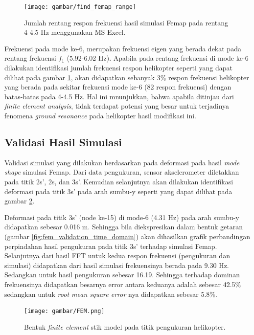 \begin{figure}[h]
	\centering
	\texttt{[image: gambar/find\_femap\_range]}
	\caption{Jumlah rentang respon frekuensi hasil simulasi Femap pada rentang 4-4.5 Hz menggunakan MS Excel.}
	\label{fig:fem_range}
\end{figure}


Frekuensi pada mode ke-6, merupakan frekuensi eigen yang berada dekat pada rentang frekuensi $f_1$ (5.92-6.02 Hz). Apabila pada rentang frekuensi di mode ke-6 dilakukan identifikasi jumlah frekuensi respon helikopter seperti yang dapat dilihat pada gambar \ref{fig:fem_range}, akan didapatkan sebanyak $3\%$ respon frekuensi helikopter yang berada pada sekitar frekuensi mode ke-6 (82 respon frekuensi) dengan batas-batas pada 4-4.5 Hz. Hal ini mnunjukkan, bahwa apabila ditinjau dari \textit{finite element analysis}, tidak terdapat potensi yang besar untuk terjadinya fenomena \textit{ground resonance} pada helikopter hasil modifikasi ini. 

\subsection{Validasi Hasil Simulasi}

Validasi simulasi yang dilakukan berdasarkan pada deformasi pada hasil \textit{mode shape} simulasi Femap. Dari data pengukuran, sensor akselerometer diletakkan pada titik 2s', 2s, dan 3s'. Kemudian selanjutnya akan dilakukan identifikasi deformasi pada titik 3s' pada arah sumbu-y seperti yang dapat dilihat pada gambar \ref{fig:FEM_pengukuran}.

Deformasi pada titik 3s' (node ke-15) di mode-6 (4.31 Hz) pada arah sumbu-y didapatkan sebesar 0.016 m. Sehingga bila diekspresikan dalam bentuk getaran (gambar \ref{fig:fem_validation_time_domain}) akan dihasilkan grafik perbandingan perpindahan hasil pengukuran pada titik 3s' terhadap simulasi Femap. Selanjutnya dari hasil FFT untuk kedua respon frekuensi (pengukuran dan simulasi) didapatkan dari hasil simulasi frekuensinya berada pada 9.30 Hz. Sedangkan untuk hasil pengukuran sebesar 16.19. Sehingga terhadap dominan frekuensinya didapatkan besarnya error antara keduanya adalah sebesar 42.5$\%$ sedangkan untuk \textit{root mean square error} nya didapatkan sebesar 5.8$\%$. 

\begin{figure}[H]
	\centering
	\texttt{[image: gambar/FEM.png]}
	\caption{Bentuk \textit{finite element} stik model pada titik pengukuran helikopter.}
	\label{fig:FEM_pengukuran}
\end{figure}

